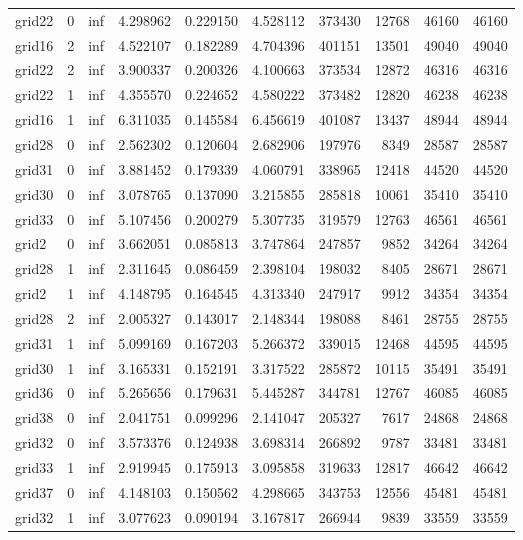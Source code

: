 \begin{longtable}{|l|r|r|r|r|r|r|r|r|r|}
grid22 & 0 & inf & 4.298962 & 0.229150 & 4.528112 & 373430 & 12768 & 46160 & 46160 \\
grid16 & 2 & inf & 4.522107 & 0.182289 & 4.704396 & 401151 & 13501 & 49040 & 49040 \\
grid22 & 2 & inf & 3.900337 & 0.200326 & 4.100663 & 373534 & 12872 & 46316 & 46316 \\
grid22 & 1 & inf & 4.355570 & 0.224652 & 4.580222 & 373482 & 12820 & 46238 & 46238 \\
grid16 & 1 & inf & 6.311035 & 0.145584 & 6.456619 & 401087 & 13437 & 48944 & 48944 \\
grid28 & 0 & inf & 2.562302 & 0.120604 & 2.682906 & 197976 & 8349 & 28587 & 28587 \\
grid31 & 0 & inf & 3.881452 & 0.179339 & 4.060791 & 338965 & 12418 & 44520 & 44520 \\
grid30 & 0 & inf & 3.078765 & 0.137090 & 3.215855 & 285818 & 10061 & 35410 & 35410 \\
grid33 & 0 & inf & 5.107456 & 0.200279 & 5.307735 & 319579 & 12763 & 46561 & 46561 \\
grid2 & 0 & inf & 3.662051 & 0.085813 & 3.747864 & 247857 & 9852 & 34264 & 34264 \\
grid28 & 1 & inf & 2.311645 & 0.086459 & 2.398104 & 198032 & 8405 & 28671 & 28671 \\
grid2 & 1 & inf & 4.148795 & 0.164545 & 4.313340 & 247917 & 9912 & 34354 & 34354 \\
grid28 & 2 & inf & 2.005327 & 0.143017 & 2.148344 & 198088 & 8461 & 28755 & 28755 \\
grid31 & 1 & inf & 5.099169 & 0.167203 & 5.266372 & 339015 & 12468 & 44595 & 44595 \\
grid30 & 1 & inf & 3.165331 & 0.152191 & 3.317522 & 285872 & 10115 & 35491 & 35491 \\
grid36 & 0 & inf & 5.265656 & 0.179631 & 5.445287 & 344781 & 12767 & 46085 & 46085 \\
grid38 & 0 & inf & 2.041751 & 0.099296 & 2.141047 & 205327 & 7617 & 24868 & 24868 \\
grid32 & 0 & inf & 3.573376 & 0.124938 & 3.698314 & 266892 & 9787 & 33481 & 33481 \\
grid33 & 1 & inf & 2.919945 & 0.175913 & 3.095858 & 319633 & 12817 & 46642 & 46642 \\
grid37 & 0 & inf & 4.148103 & 0.150562 & 4.298665 & 343753 & 12556 & 45481 & 45481 \\
grid32 & 1 & inf & 3.077623 & 0.090194 & 3.167817 & 266944 & 9839 & 33559 & 33559 \\

\end{longtable}
